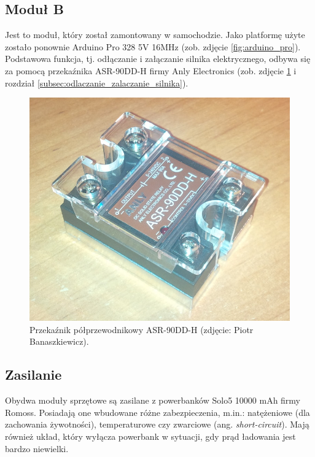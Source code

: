 \subsection{Moduł B}
\label{subsec:modul_b}

Jest to moduł, który został zamontowany w samochodzie. Jako platformę użyte zostało ponownie Arduino Pro 328 5V 16MHz \cite{Ard00} (zob. zdjęcie \ref{fig:arduino_pro}). Podstawowa funkcja, tj. odłączanie i załączanie silnika elektrycznego, odbywa się za pomocą przekaźnika ASR-90DD-H firmy Anly Electronics (zob. zdjęcie \ref{fig:SSR_relay} i rozdział \ref{subsec:odlaczanie_zalaczanie_silnika}).

\begin{figure}[h]
	\centering
	\includegraphics[scale=0.3]{pics/Anly_ASR90DDH.jpg}
	\caption{\label{fig:SSR_relay}Przekaźnik półprzewodnikowy ASR-90DD-H  (zdjęcie: Piotr Banaszkiewicz).}
\end{figure}

\subsection{Zasilanie}
\label{subsec:zasilanie}

Obydwa moduły sprzętowe są zasilane z powerbanków Solo5 10000 mAh firmy Romoss. Posiadają one wbudowane różne zabezpieczenia, m.in.: natężeniowe (dla zachowania żywotności), temperaturowe czy zwarciowe (ang. \textit{short-circuit}). Mają również układ, który wyłącza powerbank w sytuacji, gdy prąd ładowania jest bardzo niewielki.  %

